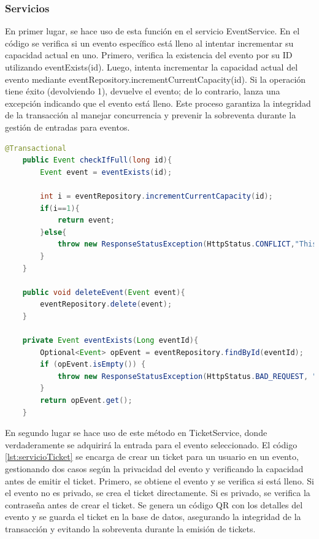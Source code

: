 \subsubsection*{Servicios}
En primer lugar, se hace uso de esta función en el servicio EventService. En el código se verifica si un evento específico está lleno al intentar incrementar su capacidad 
actual en uno. Primero, verifica la existencia del evento por su ID utilizando eventExists(id). Luego, intenta incrementar la capacidad actual del evento mediante 
eventRepository.incrementCurrentCapacity(id). Si la operación tiene éxito (devolviendo 1), devuelve el evento; de lo contrario, lanza una excepción indicando que el 
evento está lleno. Este proceso garantiza la integridad de la transacción al manejar concurrencia y prevenir la sobreventa durante la gestión de entradas para eventos.
\myjavastyle
\begin{lstlisting}[language=Java, caption=Función incrementCurrentCapacity, label=lst:servicioEvento]
    @Transactional
    public Event checkIfFull(long id){
        Event event = eventExists(id);

        int i = eventRepository.incrementCurrentCapacity(id);
        if(i==1){
            return event;
        }else{
            throw new ResponseStatusException(HttpStatus.CONFLICT,"This event is full");
        }
    }

    public void deleteEvent(Event event){
        eventRepository.delete(event);
    }

    private Event eventExists(Long eventId){
        Optional<Event> opEvent = eventRepository.findById(eventId);
        if (opEvent.isEmpty()) {
            throw new ResponseStatusException(HttpStatus.BAD_REQUEST, "Event not longer exist");
        }
        return opEvent.get();
    }
\end{lstlisting}
En segundo lugar se hace uso de este método en TicketService, donde verdaderamente se adquirirá la entrada para el evento seleccionado. El código \ref{lst:servicioTicket} se encarga de crear un ticket
para un usuario en un evento, gestionando dos casos según la privacidad del evento y verificando la capacidad antes de emitir el ticket. Primero, se obtiene el evento y se
verifica si está lleno. Si el evento no es privado, se crea el ticket directamente. Si es privado, se verifica la contraseña antes de crear el ticket. Se genera un código QR
con los detalles del evento y se guarda el ticket en la base de datos, asegurando la integridad de la transacción y evitando la sobreventa durante la emisión de tickets.
